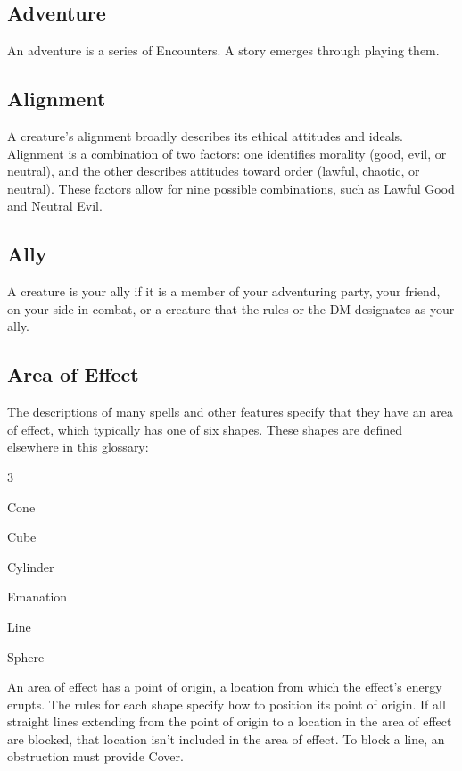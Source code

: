 \documentclass[10pt,a4paper,twoside,bg=print,twocolumn,openany,nodeprecatedcode]{dndarticle}
\begin{document}
\subsection{Adventure}
An adventure is a series of Encounters. A story emerges through playing them.

\subsection{Alignment}
A creature's alignment broadly describes its ethical attitudes and ideals. Alignment is a combination of two factors: one identifies morality (good, evil, or neutral), and the other describes attitudes toward order (lawful, chaotic, or neutral). These factors allow for nine possible combinations, such as Lawful Good and Neutral Evil.

\subsection{Ally}
A creature is your ally if it is a member of your adventuring party, your friend, on your side in combat, or a creature that the rules or the DM designates as your ally.

\subsection{Area of Effect}
The descriptions of many spells and other features specify that they have an area of effect, which typically has one of six shapes. These shapes are defined elsewhere in this glossary:


\begin{description}
\dndsans
\begin{multicols}{3}
\item Cone
\item Cube
\item Cylinder
\item Emanation
\item Line
\item Sphere
\end{multicols}

\end{description}

An area of effect has a point of origin, a location from which the effect's energy erupts. The rules for each shape specify how to position its point of origin. If all straight lines extending from the point of origin to a location in the area of effect are blocked, that location isn't included in the area of effect. To block a line, an obstruction must provide Cover.
\end{document}
